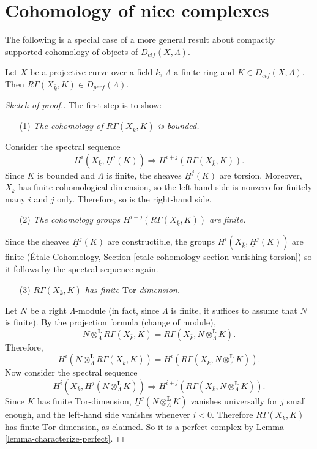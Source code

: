 \section{Cohomology of nice complexes}
\label{section-cohomology-ctf}

\noindent
The following is a special case of a more general result about
compactly supported cohomology of objects of $D_{ctf}(X, \Lambda)$.

\begin{proposition}
\label{proposition-projective-curve-constructible-cohomology}
Let $X$ be a projective curve over a field $k$, $\Lambda$ a finite ring and
$K\in D_{ctf}(X, \Lambda)$. Then $R\Gamma(X_{\bar k}, K)\in
D_{perf}(\Lambda)$.
\end{proposition}

\begin{proof}[Sketch of proof.]
The first step is to show:
\begin{enumerate}
\item[(1)]
{\it The cohomology of $R\Gamma(X_{\bar k}, K)$ is bounded.}
\end{enumerate}
Consider the spectral sequence
$$
H^i(X_{\bar k}, \underline H^j(K))
\Rightarrow
H^{i+j} (R\Gamma(X_{\bar k}, K)).
$$
Since $K$ is bounded and $\Lambda$ is finite, the sheaves $\underline H^j(K)$
are torsion. Moreover, $X_{\bar k}$ has finite cohomological dimension, so the
left-hand side is nonzero for finitely many $i$ and $j$ only. Therefore, so is
the right-hand side.
\begin{enumerate}
\item[(2)]
{\it The cohomology groups $H^{i+j} (R\Gamma(X_{\bar k}, K))$ are finite.}
\end{enumerate}
Since the sheaves $\underline H^j(K)$ are constructible, the groups
$H^i(X_{\bar k}, \underline H^j(K))$ are finite
(\'Etale Cohomology, Section \ref{etale-cohomology-section-vanishing-torsion})
so it follows by the spectral sequence again.
\begin{enumerate}
\item[(3)]
{\it $R\Gamma(X_{\bar k}, K)$ has finite $\text{Tor}$-dimension.}
\end{enumerate}
Let $N$ be a right $\Lambda$-module (in fact, since $\Lambda$ is finite, it
suffices to assume that $N$ is finite). By the projection formula (change of
module),
$$
N \otimes^\mathbf{L}_\Lambda R \Gamma(X_{\bar k}, K) = R\Gamma(X_{\bar k},
N \otimes^\mathbf{L}_\Lambda K).
$$
Therefore,
$$
H^i (N \otimes^\mathbf{L}_\Lambda R\Gamma(X_{\bar k}, K)) = H^i(R\Gamma(X_{\bar
k}, N \otimes_{\Lambda}^\mathbf{L} K)).
$$
Now consider the spectral sequence
$$
H^i (X_{\bar k}, \underline H^j (N \otimes_{\Lambda}^\mathbf{L} K))
\Rightarrow
H^{i+j}(R\Gamma(X_{\bar k}, N \otimes_{\Lambda}^\mathbf{L} K)).
$$
Since $K$ has finite $\text{Tor}$-dimension, $\underline H^j
(N \otimes_{\Lambda}^\mathbf{L} K)$ vanishes universally for $j$ small enough,
and the left-hand side vanishes whenever $i < 0$. Therefore $R\Gamma(X_{\bar
k}, K)$ has finite $\text{Tor}$-dimension, as claimed. So it is a perfect
complex by Lemma \ref{lemma-characterize-perfect}.
\end{proof}





